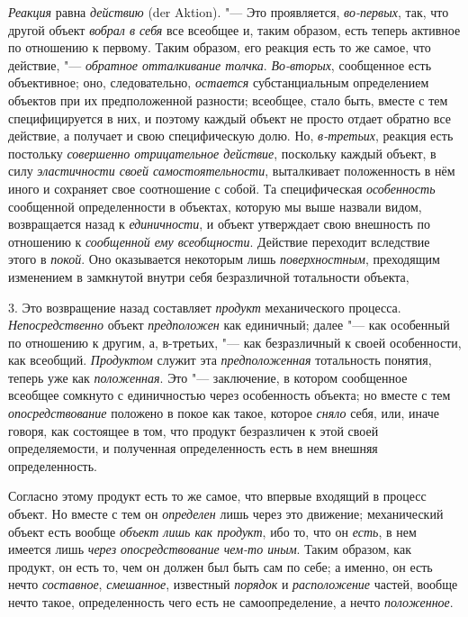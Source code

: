 {{{\em Реакция} равна
{\em действию} (der Aktion). "---
Это проявляется,
{\em во-первых},
так, что другой объект
{\em вобрал в себя} все
всеобщее и, таким образом, есть теперь активное по отношению к первому.
Таким образом, его реакция есть то же самое, что действие, "---
{\em обратное отталкивание толчка}.
{\em Во-вторых},
сообщенное есть объективное; оно, следовательно,
{\em остается}
субстанциальным определением объектов при их предположенной
разности; всеобщее, стало быть, вместе с тем специфицируется в них, и
поэтому каждый объект не просто отдает обратно все действие, а получает и
свою специфическую долю. Но,
{\em в-третьих}, реакция
есть постольку {\em совершенно
отрицательное действие}, поскольку каждый объект, в силу
{\em эластичности своей
самостоятельности}, выталкивает положенность в нём иного и
сохраняет свое соотношение с собой. Та специфическая
{\em особенность}
сообщенной определенности в объектах, которую мы выше назвали
видом, возвращается назад к
{\em единичности}, и
объект утверждает свою внешность по отношению к
{\em сообщенной ему всеобщности}.
Действие переходит вследствие этого в
{\em покой}. Оно
оказывается некоторым лишь
{\em поверхностным},
преходящим изменением в замкнутой внутри себя безразличной
тотальности объекта,

3. Это возвращение назад составляет
{\em продукт}
механического процесса.
{\em Непосредственно}
объект {\em предположен}
как единичный; далее "--- как
особенный по отношению к другим, а, в-третьих, "--- как
безразличный к своей особенности, как всеобщий.
{\em Продуктом} служит
эта {\em предположенная}
тотальность понятия, теперь уже как
{\em положенная}. Это
"--- заключение,
в котором сообщенное всеобщее сомкнуто с единичностью через
особенность объекта; но вместе с тем
{\em опосредствование}
положено в покое как такое, которое
{\em сняло} себя, или,
иначе говоря, как состоящее в том, что продукт безразличен к этой своей
определяемости, и полученная определенность есть в нем внешняя
определенность.

Согласно этому продукт есть то же самое, что впервые входящий
в процесс объект. Но вместе с тем он
{\em определен} лишь
через это движение; механический объект есть вообще
{\em объект лишь как продукт},
ибо то, что он
{\em есть}, в нем имеется
лишь {\em через опосредствование
чем-то иным}. Таким образом, как продукт, он есть то,
чем он должен был быть сам по себе; а именно, он есть нечто
{\em составное},
{\em смешанное}, известный
{\em порядок} и
{\em расположение}
частей, вообще нечто такое, определенность чего есть не
самоопределение, а нечто
{\em положенное}.

}}
